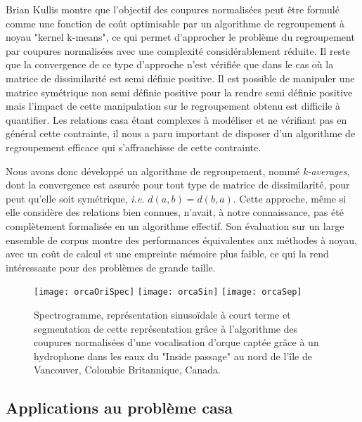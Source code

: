  Brian Kullis montre que l'objectif des coupures normalisées peut être formulé comme une fonction de coût optimisable par un algorithme de regroupement à noyau "kernel k-means", ce qui permet d'approcher le problème du regroupement par coupures normalisées avec une complexité considérablement réduite. Il reste que la convergence de ce type d'approche n'est vérifiée que dans le cas où la matrice de dissimilarité est semi définie positive. Il est possible de manipuler une matrice symétrique non semi définie positive pour la rendre semi définie positive\cite{optimal2003} mais l'impact de cette manipulation sur le regroupement obtenu est difficile à quantifier. Les relations casa étant complexes à modéliser et ne vérifiant pas en général cette contrainte, il nous a paru important de disposer d'un algorithme de regroupement efficace qui s'affranchisse de cette contrainte.

  Nous avons donc développé un algorithme de regroupement, nommé \textsl{k-averages}, dont la convergence est assurée pour tout type de matrice de dissimilarité, pour peut qu'elle soit symétrique, \textit{i.e.} $d(a, b) = d(b,a)$. Cette approche, même si elle considère des relations bien connues, n'avait, à notre connaissance, pas été complètement formalisée  en un algorithme effectif. Son évaluation sur un large ensemble de corpus\cite{UCRArchive} montre des performances équivalentes aux méthodes à noyau, avec un coût de calcul et une empreinte mémoire plus faible, ce qui la rend intéressante pour des problèmes de grande taille\cite{rossignolhal-01122006}.

  \begin{figure}[t]
    \texttt{[image: orcaOriSpec]}
    \texttt{[image: orcaSin]}
    \texttt{[image: orcaSep]}
    \label{fig:orca}
    \caption{Spectrogramme, représentation sinusoïdale à court terme et segmentation de cette représentation grâce à l'algorithme des coupures normalisées d'une vocalisation d'orque captée grâce à un hydrophone dans les eaux du "Inside passage" au nord de l'île de Vancouver, Colombie Britannique, Canada.}
  \end{figure}

  \subsection{Applications au problème casa}


